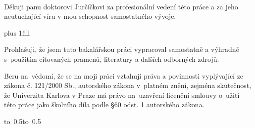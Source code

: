 \documentclass[12pt,a4paper]{report}
\let\openright=\clearpage
\begin{document}
\newpage
~
\newpage



\openright

\noindent
Děkuji panu doktorovi Jurčíčkovi za profesionální vedení této práce a za jeho neutuchající víru v mou schopnost samostatného vývoje.

\newpage


\vglue 0pt plus 1fill

\noindent
Prohlašuji, že jsem tuto bakalářskou práci vypracoval samostatně a výhradně
s~použitím citovaných pramenů, literatury a dalších odborných zdrojů.

\medskip\noindent
Beru na~vědomí, že se na moji práci vztahují práva a povinnosti vyplývající
ze zákona č. 121/2000 Sb., autorského zákona v~platném znění, zejména skutečnost,
že Univerzita Karlova v Praze má právo na~uzavření licenční smlouvy o~užití této
práce jako školního díla podle §60 odst. 1 autorského zákona.

\vspace{10mm}

\hbox{\hbox to 0.5\hbox to 0.5}

\vspace{20mm}
\newpage

\end{document}
